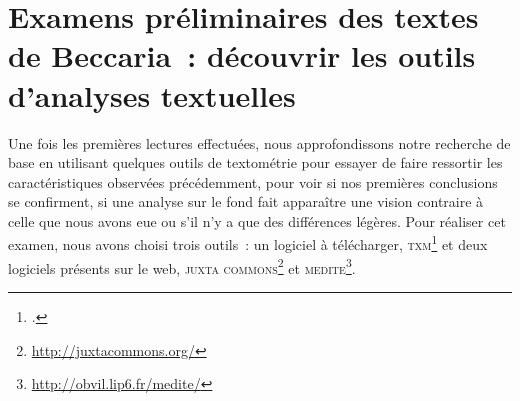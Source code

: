 \section{Examens préliminaires des textes de Beccaria~: découvrir les outils d'analyses textuelles}
Une fois les premières lectures effectuées, nous approfondissons notre recherche de base en utilisant quelques outils de textométrie pour essayer de faire ressortir les caractéristiques observées précédemment, pour voir si nos premières conclusions se confirment, si une analyse sur le fond fait apparaître une vision contraire à celle que nous avons eue ou s'il n'y a que des différences légères. Pour réaliser cet examen, nous avons choisi trois outils~: un logiciel à télécharger, \textsc{txm}{\footcite{txm_plateforme}} et deux logiciels présents sur le web, \textsc{juxta commons}{\footnote{\url{http://juxtacommons.org/}}} et \textsc{medite}{\footnote{\url{http://obvil.lip6.fr/medite/}}}.

